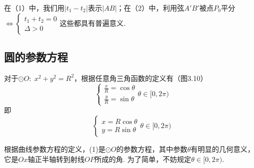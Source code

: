\begin{remark}
在（1）中，我们用$|t_1-t_2|$表示$|AB|$；在（2）中，利用弦$A'B'$被点$P_0$平分$\Longleftrightarrow \begin{cases}
    t_1+t_2=0\\ \Delta >0
\end{cases}$这些都具有普遍意义.
\end{remark}

\subsection{圆的参数方程}
\noindent
\begin{minipage}{.5\textwidth}\CTEXindent
    对于$\odot O:\; x^2+y^2=R^2$，根据任意角三角函数的定义有（图3.10）
    \[\begin{cases}
        \frac{x}{R}=\cos\theta\\[1.5ex]
        \frac{y}{R}=\sin\theta
    \end{cases}\theta\in[0,2\pi)\]
    即
    \begin{equation}
    \begin{cases}
        x=R\cos\theta\\
        y=R\sin\theta
    \end{cases}\theta\in[0,2\pi) \tag{1}
    \end{equation}
\end{minipage}
\hfill
\begin{minipage}{.45\textwidth}
\centering
{}
\end{minipage}

根据曲线参数方程的定义，(1)是$\odot O$的参数方程，其中参数$\theta$有明显的几何意义，它是$Ox$轴正半轴转到射线$OP$所成的角. 为了简单，不妨规定$\theta\in[0,2\pi)$.

